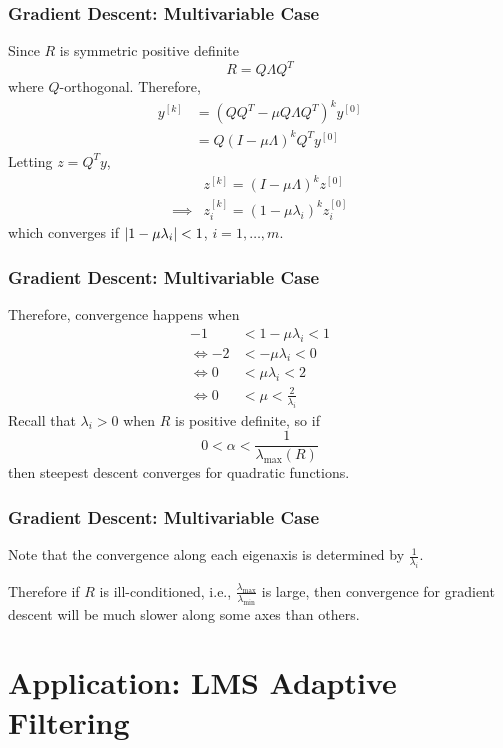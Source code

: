 \documentclass{beamer}
\begin{document}
\begin{frame}\frametitle{Gradient Descent: Multivariable Case}
	Since $R$ is symmetric positive definite
	\[ 
		R = Q\Lambda Q^T 
	\]
	where $Q$-orthogonal.
	Therefore,
	\begin{align*}
		y^{[k]} 
			&= (QQ^T-\mu Q\Lambda Q^T)^ky^{[0]}\\
			&= Q(I-\mu\Lambda)^kQ^Ty^{[0]}
	\end{align*}
	Letting $z = Q^Ty$,
	\begin{align}
		& z^{[k]} = (I - \mu\Lambda)^kz^{[0]}\\
		\implies &
		z^{[k]}_i = (1 - \mu \lambda_i)^kz_i^{[0]}
	\end{align}
	which converges if $\left|1-\mu\lambda_i\right| < 1$, $i = 1, \ldots, m$.	
\end{frame}

\begin{frame}\frametitle{Gradient Descent: Multivariable Case}
	Therefore, convergence happens when
	\begin{align*}
	-1 &< 1 - \mu \lambda_i < 1 \\
	\iff -2 &< -\mu\lambda_i < 0\\
	\iff 0 &< \mu\lambda_i < 2\\
	\iff 0 &< \mu < \frac{2}{\lambda_i} 
	\end{align*}
	Recall that $\lambda_i > 0$ when $R$ is positive definite, 
	so if
	\[ 
		0 < \alpha < \frac{1}{\lambda_{\max}(R)} 
	\]
	then steepest descent converges for quadratic functions.
\end{frame}

\begin{frame}\frametitle{Gradient Descent: Multivariable Case}
	Note that the convergence along each eigenaxis is determined by 
	\(
		\frac{1}{\lambda_i}.
	\)	
	
	\vfill

	Therefore if $R$ is ill-conditioned, i.e., $\displaystyle \frac{\lambda_{\max}}{\lambda_{\min}}$ is large, then convergence for gradient descent will be much slower along some axes than others.	
\end{frame}

\section{Application:  LMS Adaptive Filtering}
\frame{\sectionpage}
\end{document}
